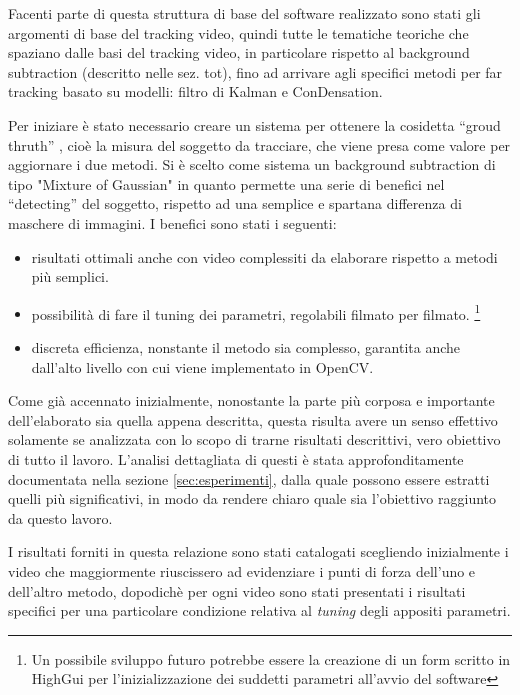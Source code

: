 Facenti parte di questa struttura di base del software realizzato sono stati gli argomenti di base del tracking video, quindi tutte le tematiche teoriche che spaziano dalle basi del tracking video, in particolare rispetto al background subtraction (descritto nelle sez. tot), fino ad arrivare agli specifici metodi per far tracking basato su modelli: filtro di Kalman e ConDensation.

Per iniziare è stato necessario creare un sistema per ottenere la cosidetta ``groud thruth'' , cioè la misura del soggetto da tracciare, che viene presa come valore per aggiornare i due metodi.
Si è scelto come sistema un background subtraction di tipo "Mixture of Gaussian" in quanto permette una serie di benefici nel ``detecting'' del soggetto, rispetto ad una semplice e spartana differenza di maschere di immagini. I benefici sono stati i seguenti:

\begin{itemize}
\item risultati ottimali anche con video complessiti da elaborare rispetto a metodi più semplici.
\item possibilità di fare il tuning dei parametri, regolabili filmato per filmato. \footnote{Un possibile sviluppo futuro potrebbe essere la creazione di un form scritto in HighGui per l'inizializzazione dei suddetti parametri all'avvio del software}
\item discreta efficienza, nonstante il metodo sia complesso, garantita anche dall'alto livello con cui viene implementato in OpenCV.
\end{itemize}

Come già accennato inizialmente, nonostante la parte più corposa e importante dell'elaborato sia quella appena descritta, questa risulta avere un senso effettivo solamente se analizzata con lo scopo di trarne risultati descrittivi, vero obiettivo di tutto il lavoro. L'analisi dettagliata di questi è stata approfonditamente documentata nella sezione \ref{sec:esperimenti}, dalla quale possono essere estratti quelli più significativi, in modo da rendere chiaro quale sia l'obiettivo raggiunto da questo lavoro. 

I risultati forniti in questa relazione sono stati catalogati scegliendo inizialmente i video che maggiormente riuscissero ad evidenziare i punti di forza dell'uno e dell'altro metodo, dopodichè per ogni video sono stati presentati i risultati specifici per una particolare condizione relativa al \emph{tuning} degli appositi parametri. 

